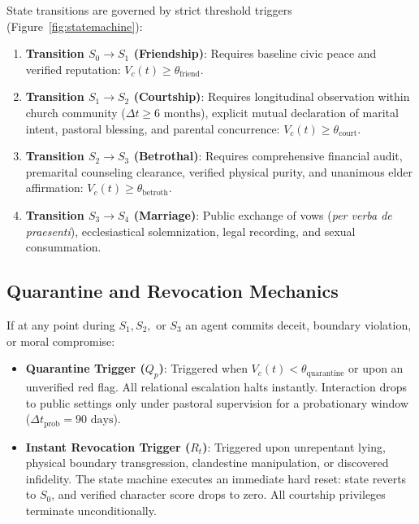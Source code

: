 \documentclass[11pt,twocolumn]{article}
\begin{document}
State transitions are governed by strict threshold triggers (Figure~\ref{fig:statemachine}):
\begin{enumerate}
    \item \textbf{Transition $S_0 \to S_1$ (Friendship)}: Requires baseline civic peace and verified reputation: $V_c(t) \ge \theta_{\text{friend}}$.
    \item \textbf{Transition $S_1 \to S_2$ (Courtship)}: Requires longitudinal observation within church community ($\Delta t \ge 6 \text{ months}$), explicit mutual declaration of marital intent, pastoral blessing, and parental concurrence: $V_c(t) \ge \theta_{\text{court}}$.
    \item \textbf{Transition $S_2 \to S_3$ (Betrothal)}: Requires comprehensive financial audit, premarital counseling clearance, verified physical purity, and unanimous elder affirmation: $V_c(t) \ge \theta_{\text{betroth}}$.
    \item \textbf{Transition $S_3 \to S_4$ (Marriage)}: Public exchange of vows (\textit{per verba de praesenti}), ecclesiastical solemnization, legal recording, and sexual consummation.
\end{enumerate}

\subsection{Quarantine and Revocation Mechanics}
If at any point during $S_1, S_2,$ or $S_3$ an agent commits deceit, boundary violation, or moral compromise:
\begin{itemize}
    \item \textbf{Quarantine Trigger ($Q_p$)}: Triggered when $V_c(t) < \theta_{\text{quarantine}}$ or upon an unverified red flag. All relational escalation halts instantly. Interaction drops to public settings only under pastoral supervision for a probationary window ($\Delta t_{\text{prob}} = 90 \text{ days}$).
    \item \textbf{Instant Revocation Trigger ($R_t$)}: Triggered upon unrepentant lying, physical boundary transgression, clandestine manipulation, or discovered infidelity. The state machine executes an immediate hard reset: state reverts to $S_0$, and verified character score drops to zero. All courtship privileges terminate unconditionally.
\end{itemize}
\end{document}
